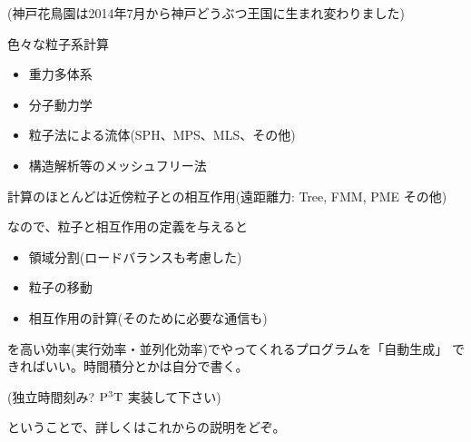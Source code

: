 \documentclass[12pt,dvipdfmx]{article}
\begin{document}
(神戸花鳥園は2014年7月から神戸どうぶつ王国に生まれ変わりました)







色々な粒子系計算

\begin{itemize}

\item 重力多体系

\item 分子動力学

\item 粒子法による流体(SPH、MPS、MLS、その他)
\item 構造解析等のメッシュフリー法

\end{itemize}

計算のほとんどは近傍粒子との相互作用(遠距離力: Tree, FMM, PME その他)



なので、粒子と相互作用の定義を与えると

\begin{itemize}

\item 領域分割(ロードバランスも考慮した)

\item 粒子の移動

\item 相互作用の計算(そのために必要な通信も)

\end{itemize}

を高い効率(実行効率・並列化効率)でやってくれるプログラムを「自動生成」
できればいい。時間積分とかは自分で書く。

(独立時間刻み? $\rm P^3T$ 実装して下さい)

ということで、詳しくはこれからの説明をどぞ。
\end{document}
